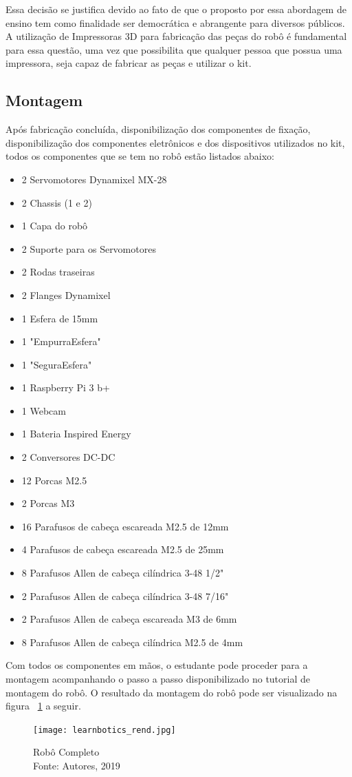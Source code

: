 Essa decisão se justifica devido ao fato de que o proposto por essa abordagem de ensino tem como finalidade ser democrática e abrangente para diversos públicos. A utilização de Impressoras 3D para fabricação das peças do robô é fundamental para essa questão, uma vez que possibilita que qualquer pessoa que possua uma impressora, seja capaz de fabricar as peças e utilizar o kit.

\subsection{Montagem}
Após fabricação concluída, disponibilização dos componentes de fixação, disponibilização dos componentes eletrônicos e dos dispositivos utilizados no kit, todos os componentes que se tem no robô estão listados abaixo:
\begin{itemize}
	\item 2 Servomotores Dynamixel MX-28
	\item 2 Chassis (1 e 2)
	\item 1 Capa do robô
	\item 2 Suporte para os Servomotores
	\item 2 Rodas traseiras
	\item 2 Flanges Dynamixel
	\item 1 Esfera de 15mm
	\item 1 "EmpurraEsfera"
	\item 1 "SeguraEsfera"
	\item 1 Raspberry Pi 3 b+
	\item 1 Webcam
	\item 1 Bateria Inspired Energy
	\item 2 Conversores DC-DC
	\item 12 Porcas M2.5
	\item 2 Porcas M3
	\item 16 Parafusos de cabeça escareada M2.5 de 12mm
	\item 4 Parafusos de cabeça escareada M2.5 de 25mm
	\item 8 Parafusos Allen de cabeça cilíndrica 3-48 1/2"
	\item 2 Parafusos Allen de cabeça cilíndrica 3-48 7/16"
	\item 2 Parafusos Allen de cabeça escareada M3 de 6mm
	\item 8 Parafusos Allen de cabeça cilíndrica M2.5 de 4mm
\end{itemize}
Com todos os componentes em mãos, o estudante pode proceder para a montagem acompanhando o passo a passo disponibilizado no tutorial de montagem do robô. \cite{tutMont} O resultado da montagem do robô pode ser visualizado na figura ~\ref{fig:learnbotics_rend} a seguir.
\begin{figure}[h!]
	\centering
	\texttt{[image: learnbotics\_rend.jpg]}\\
	\caption{Robô Completo \\ Fonte: Autores, 2019}
	\label{fig:learnbotics_rend}
\end{figure}
 

